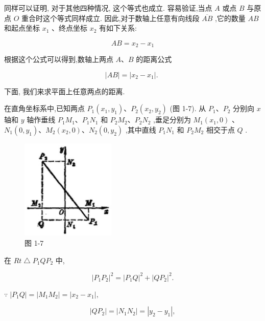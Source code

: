 \documentclass[lang=cn,newtx,10pt,scheme=chinese]{elegantbook}
\begin{document}
同样可以证明, 对于其他四种情况, 这个等式也成立. 容易验证,当点 \(A\) 或点 \(B\) 与原点 \(O\) 重合时这个等式同样成立. 因此,对于数轴上任意有向线段 \(\overline{AB}\) ,它的数量 \({AB}\) 和起点坐标 \({x}_{1}\) 、终点坐标 \({x}_{2}\) 有如下关系:

\[
    {AB} = {x}_{2} - {x}_{1}
\]

根据这个公式可以得到,数轴上两点 \(A\text{、}B\) 的距离公式

\[
  \left| {AB}\right| = \left| {{x}_{2} - {x}_{1}}\right| \text{. }
\]

下面, 我们来求平面上任意两点的距离.

在直角坐标系中,已知两点 \({P}_{1}\left( {{x}_{1},{y}_{1}}\right) \text{、}{P}_{2}\left( {{x}_{2},{y}_{2}}\right)\) (图 1-7). 从 \({P}_{1}\text{、}{P}_{2}\) 分别向 \(x\) 轴和 \(y\) 轴作垂线 \({P}_{1}{M}_{1}\text{、}{P}_{1}{N}_{1}\) 和 \({P}_{2}{M}_{2}\text{、}{P}_{2}{N}_{2}\) ,垂足分别为 \({M}_{1}\left( {{x}_{1},0}\right)\) 、 \({N}_{1}\left( {0,{y}_{1}}\right) \text{、}{M}_{2}\left( {{x}_{2},0}\right) \text{、}{N}_{2}\left( {0,{y}_{2}}\right)\) ,其中直线 \({P}_{1}{N}_{1}\) 和 \({P}_{2}{M}_{2}\) 相交于点 \(Q\) .

\begin{figure}[h]
  \centering
  \includegraphics[max width=0.4\textwidth]{images/01912cc2-ffb6-728e-9ae7-b113ff05c64b_10_261177.jpg}
  \caption{图 1-7}
\end{figure}



在 \({Rt}\bigtriangleup {P}_{1}Q{P}_{2}\) 中,

\[
    {\left| {P}_{1}{P}_{2}\right| }^{2} = {\left| {P}_{1}Q\right| }^{2} + {\left| Q{P}_{2}\right| }^{2}.
\]

\(\because \;\left| {{P}_{1}Q}\right| = \left| {{M}_{1}{M}_{2}}\right| = \left| {{x}_{2} - {x}_{1}}\right| ,\)

\[
  \left| {Q{P}_{2}}\right| = \left| {{N}_{1}{N}_{2}}\right| = \left| {{y}_{2} - {y}_{1}}\right| ,
\]
\end{document}
